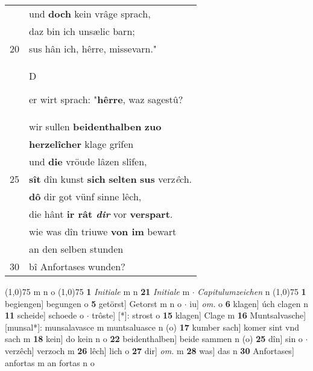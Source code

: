 \documentclass[8pt,a4paper,notitlepage]{article}
\begin{document}
\begin{table}[ht]
\begin{minipage}[t]{0.5\linewidth}
\begin{tabular}{rl}
 & und \textbf{doch} kein vrâge sprach,\\ 
 & daz bin ich unsælic barn;\\ 
20 & sus hân ich, hêrre, missevarn."\\ 
 & \begin{large}D\end{large}er wirt sprach: "\textbf{hêrre}, waz sagestû?\\ 
 & wir sullen \textbf{beidenthalben} \textbf{zuo}\\ 
 & \textbf{herzelîcher} klage grîfen\\ 
 & und \textbf{die} vröude lâzen slîfen,\\ 
25 & \textbf{sît} dîn kunst \textbf{sich} \textbf{selten} \textbf{sus} verz\textit{ê}ch.\\ 
 & \textbf{dô} dir got vünf sinne lêch,\\ 
 & die hânt \textbf{ir rât \textit{dir}} vor \textbf{verspart}.\\ 
 & wie was dîn triuwe \textbf{von im} bewart\\ 
 & an den selben stunden\\ 
30 & bî Anfortases wunden?\\ 
\end{tabular}
\scriptsize
\line(1,0){75} \newline
m n o \newline
\line(1,0){75} \newline
\textbf{1} \textit{Initiale} m n  \textbf{21} \textit{Initiale} m   $\cdot$ \textit{Capitulumzeichen} n  \newline
\line(1,0){75} \newline
\textbf{1} begiengen] begungen o \textbf{5} getörst] Getorst m n o  $\cdot$ iu] \textit{om.} o \textbf{6} klagen] úch clagen n \textbf{11} scheide] schoede o  $\cdot$ trôste] [*]: strost o \textbf{15} klagen] Clage m \textbf{16} Muntsalvasche] [munsal*]: munsalavasce m muntsaluasce n (o) \textbf{17} kumber sach] komer sint vnd sach m \textbf{18} kein] do kein n o \textbf{22} beidenthalben] beide sammen n (o) \textbf{25} dîn] sin o  $\cdot$ verzêch] verzoch m \textbf{26} lêch] lich o \textbf{27} dir] \textit{om.} m \textbf{28} was] das n \textbf{30} Anfortases] anfortas m an fortas n o \newline
\end{minipage}
\end{table}
\newpage
\end{document}
